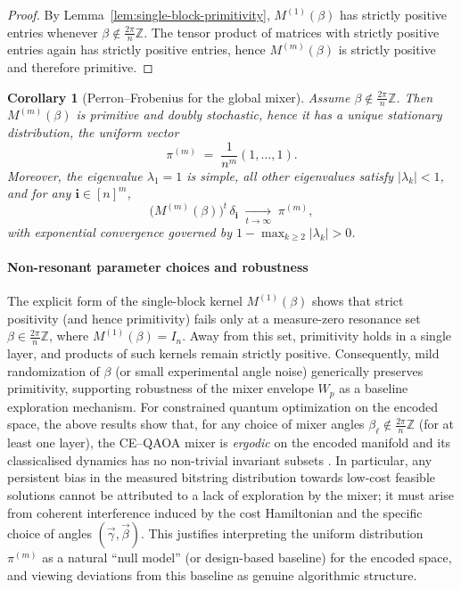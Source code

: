 \documentclass[a4paper,unpublished,onecolumn,11pt]{quantumarticle}
\newtheorem{corollary}[theorem]{Corollary}
\theoremstyle{definition}
\theoremstyle{remark}
\begin{document}
\begin{proof}
By Lemma~\ref{lem:single-block-primitivity}, $M^{(1)}(\beta)$ has strictly positive
entries whenever $\beta\notin\frac{2\pi}{n}\mathbb Z$. The tensor product of
matrices with strictly positive entries again has strictly positive entries, hence
$M^{(m)}(\beta)$ is strictly positive and therefore primitive.
\end{proof}

\begin{corollary}[Perron--Frobenius for the global mixer]
\label{cor:PF-global-mixer}
Assume $\beta\notin \frac{2\pi}{n}\mathbb{Z}$. Then $M^{(m)}(\beta)$ is primitive and
doubly stochastic, hence it has a unique stationary distribution, the uniform vector \cite{Seneta2006}
\[
  \pi^{(m)} \;=\; \frac{1}{n^m}(1,\dots,1).
\]
Moreover, the eigenvalue $\lambda_1=1$ is simple, all other eigenvalues satisfy
$|\lambda_k|<1$, and for any $\mathbf{i}\in[n]^m$,
\[
  \bigl(M^{(m)}(\beta)\bigr)^t \,\delta_{\mathbf{i}}
  \;\xrightarrow[t\to\infty]{}\;
  \pi^{(m)},
\]
with exponential convergence governed by $1-\max_{k\ge 2}|\lambda_k|>0$.
\end{corollary}



\paragraph{Non-resonant parameter choices and robustness}
\label{sec:clarify-params}
The explicit form of the single-block kernel $M^{(1)}(\beta)$ shows that strict positivity (and hence primitivity) fails only at a measure-zero resonance set $\beta\in\frac{2\pi}{n}\mathbb Z$, where $M^{(1)}(\beta)=I_n$.
Away from this set, primitivity holds in a single layer, and products of such kernels remain strictly positive. Consequently, mild randomization of $\beta$ (or small experimental angle noise) generically preserves primitivity, supporting robustness of the mixer envelope $W_p$ as a baseline exploration mechanism. For constrained quantum optimization on the encoded space, the above
results show that, for any choice of mixer angles
$\beta_\ell \notin \frac{2\pi}{n}\mathbb{Z}$ (for at least one layer),
the CE--QAOA mixer is \emph{ergodic} on the encoded manifold and its classicalised dynamics has no non-trivial invariant subsets \cite{Seneta2006,tsvelikhovskiy2024symmetries}.  In particular, any persistent bias in the measured bitstring distribution towards low-cost feasible solutions cannot be attributed to a lack of exploration by the mixer; it must
arise from coherent interference induced by the cost Hamiltonian and the specific choice of angles $(\vec\gamma,\vec\beta)$.  This justifies interpreting the uniform distribution $\pi^{(m)}$ as a natural ``null model'' (or design-based baseline) for the encoded space, and viewing deviations from this baseline as genuine algorithmic structure\cite{onahfund}.
\end{document}
